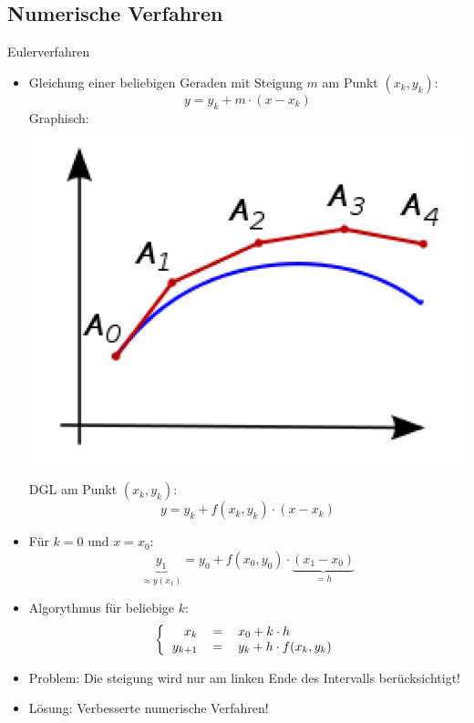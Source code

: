 \subsection{Numerische Verfahren}
\begin{definition}{Eulerverfahren}
  \begin{itemize}
    \item Gleichung einer beliebigen Geraden mit Steigung \(m\) am Punkt \((x_k,y_k)\):
      \[y=y_k+m\cdot(x-x_k)\] 
      Graphisch:
  \begin{center}
  \includegraphics[width=0.4\linewidth]{images/Newtonverfahren.png}
  \end{center}
      DGL am Punkt \((x_k,y_k)\):
      \[y=y_k+f(x_k,y_k)\cdot (x-x_k)\]
    \item Für \(k=0 \text{ und } x=x_0\):
      \[\underbrace{y_1}_{\approx y(x_1)}=y_0+f(x_0,y_0)\cdot\underbrace{(x_1-x_0)}_{=h}\]
    \item Algorythmus für beliebige \(k\):
      \[\left\{\begin{tabular}{rcl}
	  \(x_k\)&\(=\)&\(x_0+k\cdot h\)\\
	  \(y_{k+1}\)&\(=\)&\(y_k+h\cdot f(x_k,y_k)\)
	\end{tabular}
      \right.\]
    \item Problem: Die steigung wird nur am linken Ende des Intervalls berücksichtigt!
    \item Lösung: Verbesserte numerische Verfahren!
  \end{itemize}
\end{definition}
